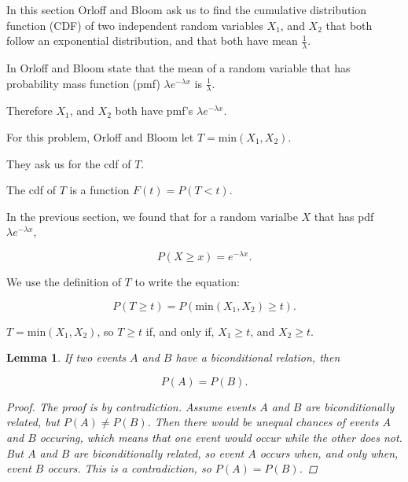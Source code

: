\documentclass[a5paper,11pt]{article}
\newtheorem{lem}[thm]{Lemma}
\begin{document}
In this section Orloff and Bloom ask us to find the cumulative distribution
function (CDF) of two independent random variables $X_1$, and $X_2$ that both
follow an exponential distribution, and that both have mean 
$\frac{1}{\lambda}$.

In \cite{reading5c} Orloff and Bloom state that the mean of a random
variable that has probability mass function (pmf) $\lambda e^{-\lambda x}$
is $\frac{1}{\lambda}$.

Therefore $X_1$, and $X_2$ both have pmf's $\lambda e^{-\lambda x}$.

For this problem, Orloff and Bloom let $T=\text{min}\left(X_1, X_2 \right)$.

They ask us for the cdf of $T$.

The cdf of $T$ is a function $F\left(t \right) = P \left(T < t \right)$.

In the previous section, we found that for a random varialbe $X$ that has pdf
$\lambda e^{-\lambda x}$, 

\begin{equation}
P\left(X \geq x \right) = e^{-\lambda x}.
\end{equation}

We use the definition of $T$ to write the equation:

\begin{equation}
P\left(T \geq t \right) = 
  P \left(\text{min}\left(X_1, X_2\right) \geq t\right).
\end{equation}


$T=\text{min}\left(X_1, X_2 \right)$, so $T \geq t$ if, and only if, 
$X_1 \geq t$, and $X_2 \geq t$.

\begin{lem}
If two events $A$ and $B$ have a biconditional relation, then

\begin{equation}
P\left(A \right) = P \left( B \right).
\end{equation}

\begin{proof}
The proof is by contradiction.  Assume events $A$ and $B$ are biconditionally
related, but $P\left(A \right) \neq P\left( B \right)$.  Then there would
be unequal chances of events $A$ and $B$ occuring, which means that one event
would occur while the other does not.  But $A$ and $B$ are biconditionally
related, so event $A$ occurs when, and only when, event $B$ occurs. This 
is a contradiction, so $P\left(A \right) = P\left( B \right)$.
\end{proof}
\end{lem}
\end{document}
